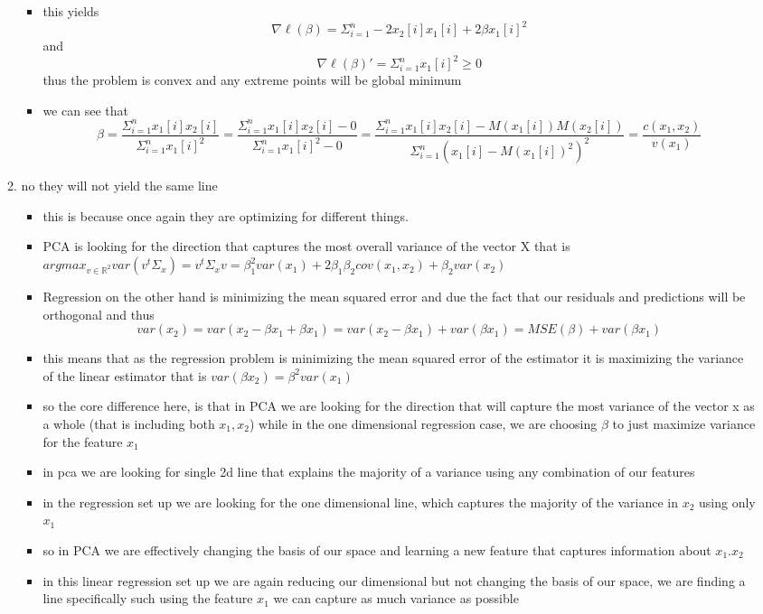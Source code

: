 \documentclass[12pt,twoside]{article}
\begin{document}
\begin{enumerate}
\begin{enumerate}
\begin{itemize}
        \item this yields $$\nabla \ell(\beta)= \Sigma_{i=1}^{n}-2x_{2}[i]x_{1}[i]+2\beta x_{1}[i]^2$$ and $$\nabla \ell (\beta)'=\Sigma_{i=1}^{n}x_{1}[i]^2\geq 0$$ thus the problem is convex and any extreme points will be global minimum 
        \item we can see that $$\beta=\frac{\Sigma_{i=1}^{n}x_{1}[i]x_{2}[i] }{\Sigma_{i=1}^{n}x_{1}[i]^2}=\frac{\Sigma_{i=1}^{n}x_{1}[i]x_{2}[i]-0 }{\Sigma_{i=1}^{n}x_{1}[i]^2-0}=\frac{\Sigma_{i=1}^{n}x_{1}[i]x_{2}[i]-M(x_{1}[i])M(x_{2}[i]) }{\Sigma_{i=1}^{n}(x_{1}[i]-M(x_{1}[i])^2)^2}=\frac{c(x_1,x_2)}{v(x_1)}$$
    \end{itemize}
    \item no they will not yield the same line 
    \begin{itemize}
        \item this is because once again they are optimizing for different things. 
        \item PCA is looking for the direction that captures the most overall variance of the vector X that is $argmax_{v \in \mathbb{R}^2}var(v^t\Sigma_{x})=v^t\Sigma_{x}v=\beta_1^2 var(x_1)+ 2\beta_1\beta_2 cov(x_1,x_2) + \beta_2 var(x_2)$ 
        \item  Regression on the other hand is minimizing the mean squared error and due the fact that our residuals and predictions will be orthogonal and thus $$var(x_2)=var(x_2-\beta x_1 +\beta x_1)=var(x_2-\beta x_1) + var(\beta x_1)=MSE(\beta)+var(\beta x_1)$$
        \item this means that as the regression problem is minimizing the mean squared error of the estimator it is maximizing the variance of the linear estimator that is $var(\beta x_2)=\beta^2 var(x_1)$
        \item so the core difference here, is that in PCA we are looking for the direction that will capture the most variance of the vector x as a whole (that is including both $x_1, x_2$)  while in the one dimensional regression case, we are choosing $\beta$ to just maximize variance for the feature $x_1$
        \item in pca we are looking for single 2d line that explains the majority of a variance using any combination of our features 
        \item in the regression set up we are  looking for the one dimensional line, which captures the majority of the variance in $x_2$ using only $x_1$
        \item so in PCA we are effectively changing the basis of our space and learning a new feature that captures information about $x_1. x_2$
        \item in this linear regression set up we are again reducing our dimensional but not changing the basis of our space, we are finding a line specifically such using the feature $x_1$ we can capture as much variance as possible
        

\end{itemize}
\end{enumerate}
\end{enumerate}
\end{document}
